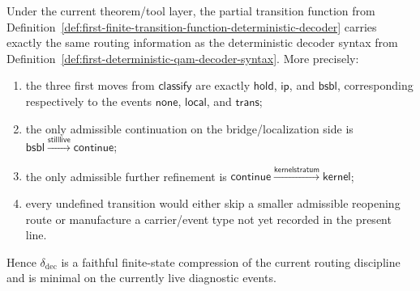 \begin{proposition}
\label{prop:finite-transition-function-equivalent-deterministic-decoder-syntax}
Under the current theorem/tool layer, the partial transition function from Definition~\ref{def:first-finite-transition-function-deterministic-decoder} carries exactly the same routing information as the deterministic decoder syntax from Definition~\ref{def:first-deterministic-qam-decoder-syntax}. More precisely:
\begin{enumerate}[label=(\roman*)]
 \item the three first moves from \(\mathsf{classify}\) are exactly \(\mathsf{hold}\), \(\mathsf{ip}\), and \(\mathsf{bsbl}\), corresponding respectively to the events \(\mathsf{none}\), \(\mathsf{local}\), and \(\mathsf{trans}\);
 \item the only admissible continuation on the bridge/localization side is \(\mathsf{bsbl}\xrightarrow{\mathsf{stilllive}}\mathsf{continue}\);
 \item the only admissible further refinement is \(\mathsf{continue}\xrightarrow{\mathsf{kernelstratum}}\mathsf{kernel}\);
 \item every undefined transition would either skip a smaller admissible reopening route or manufacture a carrier/event type not yet recorded in the present line.
\end{enumerate}
Hence \(\delta_{\mathrm{dec}}\) is a faithful finite-state compression of the current routing discipline and is minimal on the currently live diagnostic events.
\end{proposition}

